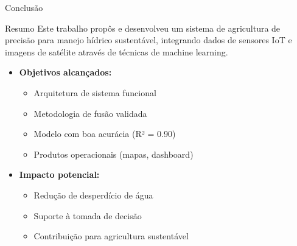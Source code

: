 \documentclass[aspectratio=169]{beamer}
\begin{document}
\begin{frame}{Conclusão}
  \begin{block}{Resumo}
    Este trabalho propôs e desenvolveu um sistema de agricultura de precisão para manejo hídrico sustentável, integrando dados de sensores IoT e imagens de satélite através de técnicas de machine learning.
  \end{block}
  
  \vspace{0.5cm}
  
  \begin{itemize}
    \item \textbf{Objetivos alcançados:}
      \begin{itemize}
        \item Arquitetura de sistema funcional
        \item Metodologia de fusão validada
        \item Modelo com boa acurácia (R² = 0.90)
        \item Produtos operacionais (mapas, dashboard)
      \end{itemize}
    
    \item \textbf{Impacto potencial:}
      \begin{itemize}
        \item Redução de desperdício de água
        \item Suporte à tomada de decisão
        \item Contribuição para agricultura sustentável
      \end{itemize}
  \end{itemize}
\end{frame}
\end{document}
